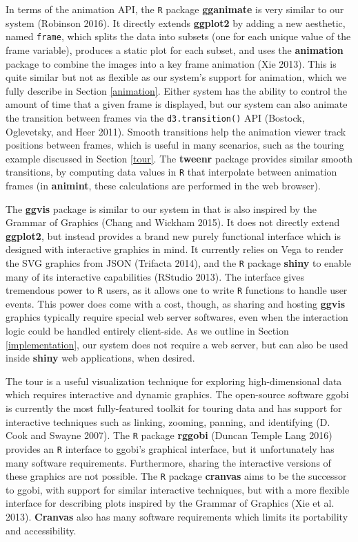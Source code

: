 \documentclass[12pt,]{article}
\theoremstyle{definition}
\theoremstyle{definition}
\theoremstyle{definition}
\theoremstyle{remark}
\begin{document}
In terms of the animation API, the \texttt{R} package \textbf{gganimate}
is very similar to our system (Robinson 2016). It directly extends
\textbf{ggplot2} by adding a new aesthetic, named \texttt{frame}, which
splits the data into subsets (one for each unique value of the frame
variable), produces a static plot for each subset, and uses the
\textbf{animation} package to combine the images into a key frame
animation (Xie 2013). This is quite similar but not as flexible as our
system's support for animation, which we fully describe in Section
\ref{animation}. Either system has the ability to control the amount of
time that a given frame is displayed, but our system can also animate
the transition between frames via the \texttt{d3.transition()} API
(Bostock, Oglevetsky, and Heer 2011). Smooth transitions help the
animation viewer track positions between frames, which is useful in many
scenarios, such as the touring example discussed in Section \ref{tour}.
The \textbf{tweenr} package provides similar smooth transitions, by
computing data values in \texttt{R} that interpolate between animation
frames (in \textbf{animint}, these calculations are performed in the web
browser).

The \textbf{ggvis} package is similar to our system in that is also
inspired by the Grammar of Graphics (Chang and Wickham 2015). It does
not directly extend \textbf{ggplot2}, but instead provides a brand new
purely functional interface which is designed with interactive graphics
in mind. It currently relies on Vega to render the SVG graphics from
JSON (Trifacta 2014), and the \texttt{R} package \textbf{shiny} to
enable many of its interactive capabilities (RStudio 2013). The
interface gives tremendous power to \texttt{R} users, as it allows one
to write \texttt{R} functions to handle user events. This power does
come with a cost, though, as sharing and hosting \textbf{ggvis} graphics
typically require special web server softwares, even when the
interaction logic could be handled entirely client-side. As we outline
in Section \ref{implementation}, our system does not require a web
server, but can also be used inside \textbf{shiny} web applications,
when desired.

The tour is a useful visualization technique for exploring
high-dimensional data which requires interactive and dynamic graphics.
The open-source software ggobi is currently the most fully-featured
toolkit for touring data and has support for interactive techniques such
as linking, zooming, panning, and identifying (D. Cook and Swayne 2007).
The \texttt{R} package \textbf{rggobi} (Duncan Temple Lang 2016)
provides an \texttt{R} interface to ggobi's graphical interface, but it
unfortunately has many software requirements. Furthermore, sharing the
interactive versions of these graphics are not possible. The \texttt{R}
package \textbf{cranvas} aims to be the successor to ggobi, with support
for similar interactive techniques, but with a more flexible interface
for describing plots inspired by the Grammar of Graphics (Xie et al.
2013). \textbf{Cranvas} also has many software requirements which limits
its portability and accessibility.
\end{document}
